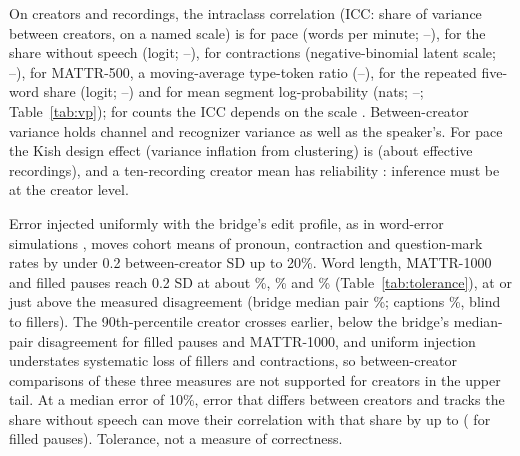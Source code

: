 On \VpCreators{} creators and \VpRecordings{} recordings, the intraclass correlation (ICC: share of variance between
creators, on a named scale) is \IccPace{} for pace (words per minute; \IccPaceLo--\IccPaceHi), \IccNonspeech{} for the
share without speech (logit; \IccNonspeechLo--\IccNonspeechHi), \IccContr{} for contractions (negative-binomial latent
scale; \IccContrLo--\IccContrHi), \IccMattr{} for MATTR-500, a moving-average type-token ratio
(\IccMattrLo--\IccMattrHi), \IccRepFive{} for the repeated five-word share (logit; \IccRepFiveLo--\IccRepFiveHi) and
\IccSegLogp{} for mean segment log-probability (nats; \IccSegLogpLo--\IccSegLogpHi; Table~\ref{tab:vp}); for counts the
ICC depends on the scale \cite{nakagawa2017coefficient}. Between-creator variance holds channel and recognizer variance
as well as the speaker's. For pace the Kish design effect (variance inflation from clustering) is \KishPace{} (about
\NeffPace{} effective recordings), and a ten-recording creator mean has reliability \RtenPace: inference must be at the
creator level.

Error injected uniformly with the bridge's edit profile, as in word-error simulations
\cite{proksch2019testing,fetic2021topic}, moves cohort means of pronoun, contraction and question-mark rates by under
0.2 between-creator SD up to 20\%. Word length, MATTR-1000 and filled pauses reach 0.2 SD at about \TolWordLenPct\%,
\TolMattrPct\% and \TolFillerPct\% (Table~\ref{tab:tolerance}), at or just above the measured disagreement (bridge
median pair \BridgeDisagreeMedianPct\%; captions \AnchorCaptionMeanPct\%, blind to fillers). The 90th-percentile
creator crosses earlier, below the bridge's median-pair disagreement for filled pauses and MATTR-1000, and uniform
injection understates systematic loss of fillers and contractions, so between-creator comparisons of these three
measures are not supported for creators in the upper tail. At a median error of 10\%, error that differs between
creators and tracks the share without speech can move their correlation with that share by up to \RSixAssocMax{}
(\RSixFillerAssoc{} for filled pauses). Tolerance, not a measure of correctness.

